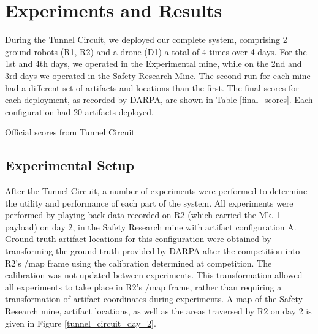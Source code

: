 \chapter{Experiments and Results}

During the Tunnel Circuit, we deployed our complete system, comprising 2 ground robots (R1, R2) and a drone (D1) a total of 4 times over 4 days. For the 1st and 4th days, we operated in the Experimental mine, while on the 2nd and 3rd days we operated in the Safety Research Mine. The second run for each mine had a different set of artifacts and locations than the first. The final scores for each deployment, as recorded by DARPA, are shown in Table \ref{final_scores}. Each configuration had 20 artifacts deployed.

\begin{table}
	\centering
	\begin{adjustbox}{max width=.95\textwidth}
	\end{adjustbox}
	\caption{Official scores from Tunnel Circuit}
	\label{final_scores}
\end{table}

\section{Experimental Setup}

After the Tunnel Circuit, a number of experiments were performed to determine the utility and performance of each part of the system. All experiments were performed by playing back data recorded on R2  (which carried the Mk. 1 payload) on day 2, in the Safety Research mine with artifact configuration A. Ground truth artifact locations for this configuration were obtained by transforming the ground truth provided by DARPA after the competition into R2's /map frame using the calibration determined at competition. The calibration was not updated between experiments. This transformation allowed all experiments to take place in R2's /map frame, rather than requiring a transformation of artifact coordinates during experiments. A map of the Safety Research mine, artifact locations, as well as the areas traversed by R2 on day 2 is given in Figure \ref{tunnel_circuit_day_2}.


